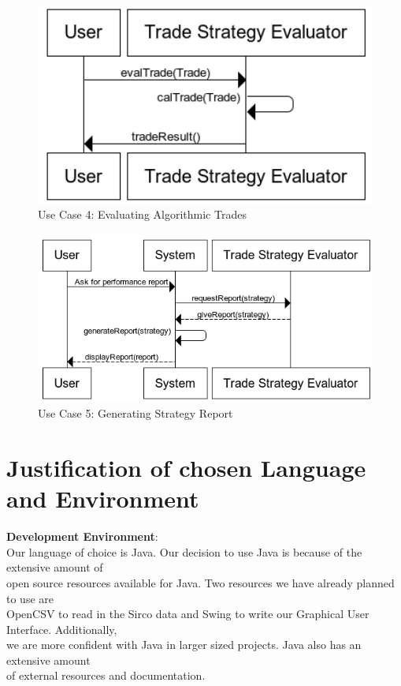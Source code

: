 \documentclass[a4paper]{article}
\begin{document}
\begin{figure}[H]
   \includegraphics[width=1\textwidth]{images/authenticationSeq}
   \caption{Use Case 4: Evaluating Algorithmic Trades}
\end{figure}

\begin{figure}[H]
   \includegraphics[width=1\textwidth]{images/generateReports}
   \caption{Use Case 5: Generating Strategy Report}
\end{figure}

\newpage

\section {Justification of chosen Language and Environment}

{\bf Development Environment}: \\
\indent Our language of choice is Java. Our decision to use Java is because of the extensive amount of \\ 
open source resources available for Java. Two resources we have already planned to use are \\
OpenCSV to read in the Sirco data and Swing to write our Graphical User Interface. Additionally, \\
we are more confident with Java in larger sized projects. Java also has an extensive amount  \\
of external resources and documentation. \\
\end{document}
